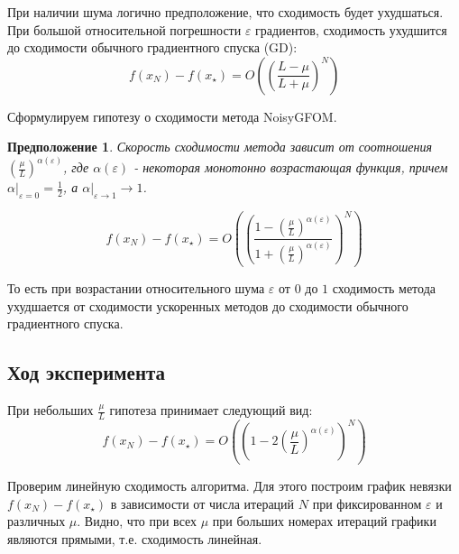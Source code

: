 \documentclass{article}
\newtheorem{proposition}{Предположение}
\begin{document}
При наличии шума логично предположение, что сходимость будет ухудшаться. При большой относительной погрешности $\varepsilon$ градиентов, сходимость ухудшится до сходимости обычного градиентного спуска (GD):
\begin{equation}\label{GDconverge}
   f(x_N) - f(x_{\star}) = O\left(\left(\frac{L - \mu}{L + \mu}\right)^N\right) 
\end{equation}

Сформулируем гипотезу о сходимости метода NoisyGFOM.

\begin{proposition}
Скорость сходимости метода зависит от соотношения $\left(\frac{\mu}{L}\right)^{\alpha(\varepsilon)}$, где $\alpha(\varepsilon)$ - некоторая монотонно возрастающая функция, причем $\alpha|_{\varepsilon = 0} = \frac12$, а $\alpha|_{\varepsilon \rightarrow 1} \rightarrow 1$. 
\end{proposition}



\begin{equation}\label{NoisyGFOMconverge}
   f(x_N) - f(x_{\star}) = O\left(\left(\frac{1 - \left(\frac{\mu}{L}\right)^{\alpha(\varepsilon)}}{1 + \left(\frac{\mu}{L}\right)^{\alpha(\varepsilon)}}\right)^N\right) 
\end{equation}

То есть при возрастании относительного шума $\varepsilon$ от $0$ до $1$ сходимость метода ухудшается от сходимости ускоренных методов до сходимости обычного градиентного спуска.

\subsection{Ход эксперимента}

При небольших $\frac{\mu}{L}$ гипотеза принимает следующий вид:
\begin{equation}\label{NoisyGFOMconverge}
   f(x_N) - f(x_{\star}) = O\left(\left(1 - 2\left(\frac{\mu}{L}\right)^{\alpha(\varepsilon)}\right)^N\right) 
\end{equation}

Проверим линейную сходимость алгоритма. Для этого построим график невязки $f(x_N) - f(x_{\star})$ в зависимости от числа итераций $N$ при фиксированном $\varepsilon$ и различных $\mu$. Видно, что при всех $\mu$ при больших номерах итераций графики являются прямыми, т.е. сходимость линейная.
\end{document}
